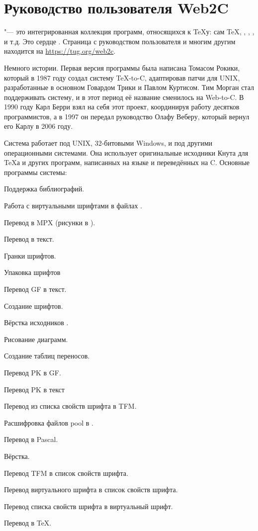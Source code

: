 \documentclass{article}
\begin{document}
\section{Руководство пользователя Web2C}

\Webc{} "--- это интегрированная коллекция программ, относящихся к
\TeX{}у: сам \TeX{}, \MF{}, \MP, \BibTeX{}, и т.д. Это сердце
\TL{}.  Страница \Webc{} с руководством пользователя и многим другим
находится на \url{https://tug.org/web2c}.

Немного истории.  Первая версия программы была написана Томасом
Рокики, который в 1987 году создал систему \TeX{}-to-C, адаптировав
патчи для UNIX, разработанные в основном Говардом Трики и Павлом
Куртисом. Тим Морган стал поддерживать систему, и в этот период её
название сменилось на Web-to-C\@.  В 1990 году Карл Берри взял на себя
этот проект, координируя работу десятков программистов, а в 1997 он
передал руководство Олафу Веберу, который вернул его Карлу в 2006
году. 

Система \Webc{} работает под UNIX, 32-битовыми Windows, \MacOSX{} и под
другими операционными системами.  Она использует оригинальные исходники
Кнута для  \TeX{}а и других программ, написанных на языке  \web{} и
переведённых на  C.  Основные программы системы:

\begin{cmddescription}
\item[bibtex]    Поддержка библиографий.
\item[dvicopy]   Работа с  виртуальными шрифтами в файлах  \dvi{}.
\item[dvitomp]   Перевод \dvi{} в MPX (рисунки в \MP{}).
\item[dvitype]   Перевод \dvi{} в текст.
\item[gftodvi]   Гранки шрифтов.
\item[gftopk]    Упаковка шрифтов
\item[gftype]    Перевод GF в текст.
\item[mf]        Создание шрифтов.
\item[mft]       Вёрстка исходников \MF{}.
\item[mpost]     Рисование  диаграмм.
\item[patgen]    Создание таблиц переносов.
\item[pktogf]    Перевод PK в GF.
\item[pktype]    Перевод PK в текст
\item[pltotf]    Перевод из списка свойств шрифта в  TFM.
\item[pooltype]  Расшифровка файлов  pool в  \web{}.
\item[tangle]    Перевод \web{} в Pascal.
\item[tex]       Вёрстка.
\item[tftopl]    Перевод TFM в список свойств шрифта.
\item[vftovp]    Перевод виртуального шрифта в список свойств шрифта.
\item[vptovf]    Перевод списка свойств шрифта в виртуальный шрифт.
\item[weave]     Перевод \web{} в \TeX.
\end{cmddescription}
\end{document}
